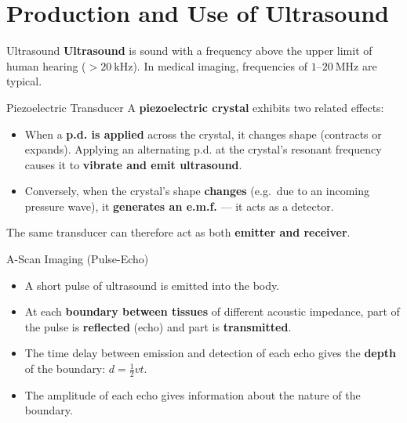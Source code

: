 

\section{Production and Use of Ultrasound}

\begin{definitionbox}{Ultrasound}
\textbf{Ultrasound} is sound with a frequency above the upper limit of human hearing ($> 20\ \text{kHz}$). In medical imaging, frequencies of $1$--$20\ \text{MHz}$ are typical.
\end{definitionbox}

\begin{definitionbox}{Piezoelectric Transducer}
A \textbf{piezoelectric crystal} exhibits two related effects:
\begin{itemize}[itemsep=2pt]
  \item When a \textbf{p.d. is applied} across the crystal, it changes shape (contracts or expands). Applying an alternating p.d. at the crystal's resonant frequency causes it to \textbf{vibrate and emit ultrasound}.
  \item Conversely, when the crystal's shape \textbf{changes} (e.g.\ due to an incoming pressure wave), it \textbf{generates an e.m.f.} — it acts as a detector.
\end{itemize}
The same transducer can therefore act as both \textbf{emitter and receiver}.
\end{definitionbox}

\begin{keybox}{A-Scan Imaging (Pulse-Echo)}
\begin{itemize}[itemsep=3pt]
  \item A short pulse of ultrasound is emitted into the body.
  \item At each \textbf{boundary between tissues} of different acoustic impedance, part of the pulse is \textbf{reflected} (echo) and part is \textbf{transmitted}.
  \item The time delay between emission and detection of each echo gives the \textbf{depth} of the boundary: $d = \tfrac{1}{2}vt$.
  \item The amplitude of each echo gives information about the nature of the boundary.
\end{itemize}
\end{keybox}

